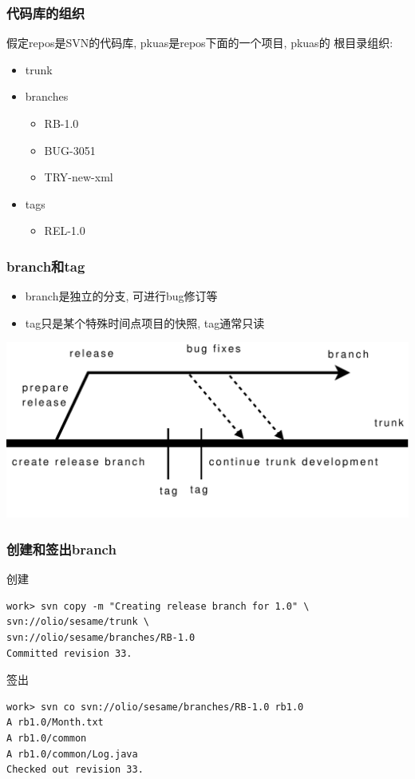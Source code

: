 \documentclass[compress]{beamer}
\begin{document}
\begin{frame}
  \frametitle{代码库的组织}
  假定repos是SVN的代码库, pkuas是repos下面的一个项目, pkuas的
  根目录组织:
  \begin{itemize}
	\item trunk
	\item branches
	  \begin{itemize}
		\item RB-1.0
		\item BUG-3051
		\item TRY-new-xml
	  \end{itemize}
	\item tags
	  \begin{itemize}
		\item REL-1.0
	  \end{itemize}
  \end{itemize}
  
\end{frame}

\begin{frame}
  \frametitle{branch和tag}
  \begin{itemize}
	\item branch是独立的分支, 可进行bug修订等
	\item tag只是某个特殊时间点项目的快照, tag通常只读
  \end{itemize}

  \centering\includegraphics[width=\hsize]{branch.pdf}
  
\end{frame}

\begin{frame}[containsverbatim]
  \frametitle{创建和签出branch}
创建\\
  {\small
\begin{Verbatim}
work> svn copy -m "Creating release branch for 1.0" \
svn://olio/sesame/trunk \
svn://olio/sesame/branches/RB-1.0
Committed revision 33.
\end{Verbatim}
}
签出
{\small
\begin{Verbatim}
work> svn co svn://olio/sesame/branches/RB-1.0 rb1.0
A rb1.0/Month.txt
A rb1.0/common
A rb1.0/common/Log.java
Checked out revision 33.
\end{Verbatim}
}
  
\end{frame}
\end{document}
